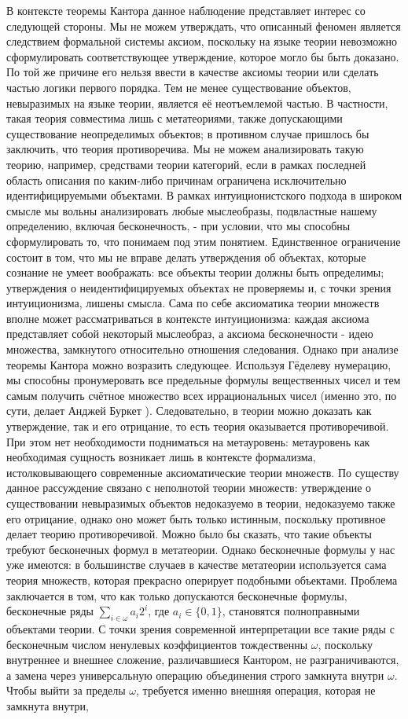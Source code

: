 \documentclass[12pt]{article}
\begin{document}
В контексте теоремы Кантора данное наблюдение представляет интерес со следующей стороны. Мы не можем утверждать, что описанный феномен является следствием формальной системы аксиом, поскольку на языке теории невозможно сформулировать соответствующее утверждение, которое могло бы быть доказано. По той же причине его нельзя ввести в качестве аксиомы теории или сделать частью логики первого порядка. Тем не менее существование объектов, невыразимых на языке теории, является её неотъемлемой частью. В частности, такая теория совместима лишь с метатеориями, также допускающими существование неопределимых объектов; в противном случае пришлось бы заключить, что теория противоречива. Мы не можем анализировать такую теорию, например, средствами теории категорий, если в рамках последней область описания по каким-либо причинам ограничена исключительно идентифицируемыми объектами. В рамках интуиционистского подхода в широком смысле мы вольны анализировать любые мыслеобразы, подвластные нашему определению, включая бесконечность, - при условии, что мы способны сформулировать то, что понимаем под этим понятием. Единственное ограничение состоит в том, что мы не вправе делать утверждения об объектах, которые сознание не умеет воображать: все объекты теории должны быть определимы; утверждения о неидентифицируемых объектах не проверяемы и, с точки зрения интуиционизма, лишены смысла. Сама по себе аксиоматика теории множеств вполне может рассматриваться в контексте интуиционизма: каждая аксиома представляет собой некоторый мыслеобраз, а аксиома бесконечности - идею множества, замкнутого относительно отношения следования. Однако при анализе теоремы Кантора можно возразить следующее. Используя Гёделеву нумерацию, мы способны пронумеровать все предельные формулы вещественных чисел и тем самым получить счётное множество всех иррациональных чисел (именно это, по сути, делает Анджей Буркет \cite{diagonal-antinomy}). Следовательно, в теории можно доказать как утверждение, так и его отрицание, то есть теория оказывается противоречивой. При этом нет необходимости подниматься на метауровень: метауровень как необходимая сущность возникает лишь в контексте формализма, истолковывающего современные аксиоматические теории множеств. По существу данное рассуждение связано с неполнотой теории множеств: утверждение о существовании невыразимых объектов недоказуемо в теории, недоказуемо также его отрицание, однако оно может быть только истинным, поскольку противное делает теорию противоречивой. Можно было бы сказать, что такие объекты требуют бесконечных формул в метатеории. Однако бесконечные формулы у нас уже имеются: в большинстве случаев в качестве метатеории используется сама теория множеств, которая прекрасно оперирует подобными объектами. Проблема заключается в том, что как только допускаются бесконечные формулы, бесконечные ряды $\sum_{i \in \omega} a_i 2^i$, где $a_i \in \{ 0,1 \}$, становятся полноправными объектами теории. С точки зрения современной интерпретации все такие ряды с бесконечным числом ненулевых коэффициентов тождественны $\omega$, поскольку внутреннее и внешнее сложение, различавшиеся Кантором, не разграничиваются, а замена через универсальную операцию объединения строго замкнута внутри $\omega$. Чтобы выйти за пределы $\omega$, требуется именно внешняя операция, которая не замкнута внутри, 
\end{document}
